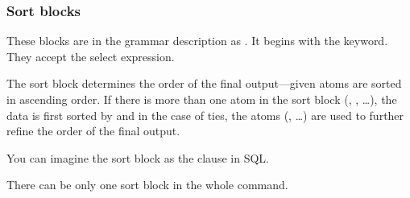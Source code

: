 \subsubsection{Sort blocks}
These blocks are in the grammar description as .
It begins with the  keyword. They accept the select expression.

The sort block determines the order of the final output---given atoms are sorted in ascending order.
If there is more than one atom in the sort block (, , \ldots), the data is first sorted by  
and in the case of ties, the atoms (, \ldots) are used to further refine the order of the final output.

You can imagine the sort block as the  clause in SQL.

There can be only one sort block in the whole command.

